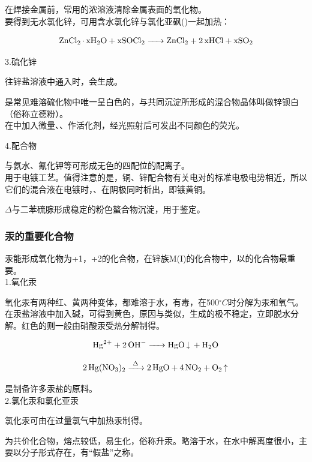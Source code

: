 \documentclass[a4paper,UTF8]{article}
\begin{document}
在焊接金属前，常用的浓溶液清除金属表面的氧化物。\\

要得到无水氯化锌，可用含水氯化锌与氯化亚砜()一起加热：

$$ \ce{ZnCl2 * xH2O + xSOCl2 -> ZnCl2 + 2xHCl + xSO2} $$

3.硫化锌

往锌盐溶液中通入时，会生成。

是常见难溶硫化物中唯一呈白色的，与共同沉淀所形成的混合物晶体叫做锌钡白（俗称立德粉）。\\

在中加入微量、、作活化剂，经光照射后可发出不同颜色的荧光。

4.配合物

与氨水、氰化钾等可形成无色的四配位的配离子。\\

用于电镀工艺。值得注意的是，铜、锌配合物有关电对的标准电极电势相近，所以它们的混合液在电镀时，、在阴极同时析出，即镀黄铜。

$\Delta$与二苯硫腙形成稳定的粉色螯合物沉淀，用于鉴定。

\subsubsection{汞的重要化合物}

汞能形成氧化物为+1，+2的化合物，在锌族M(I)的化合物中，以的化合物最重要。\\

1.氧化汞

氧化汞有两种红、黄两种变体，都难溶于水，有毒，在500$^\circ C$时分解为汞和氧气。在汞盐溶液中加入碱，可得到黄色，原因与类似，生成的极不稳定，立即脱水分解。红色的则一般由硝酸汞受热分解制得。

$$ \ce{Hg^{2+} + 2OH- -> HgO v + H2O} $$

$$ \ce{2Hg(NO3)2 ->[\Delta] 2HgO + 4NO2 + O2 ^} $$

是制备许多汞盐的原料。\\

2.氯化汞和氯化亚汞

氯化汞可由在过量氯气中加热汞制得。

为共价化合物，熔点较低，易生化，俗称升汞。略溶于水，在水中解离度很小，主要以分子形式存在，有“假盐”之称。
\end{document}
